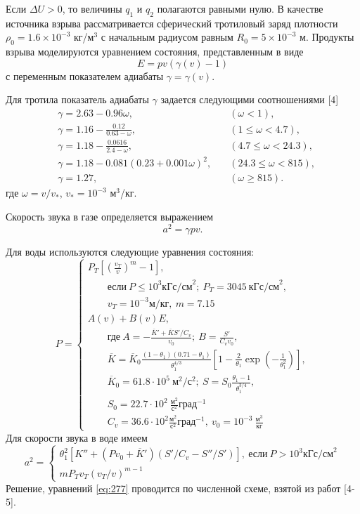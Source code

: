 \documentclass[specialist, subf, href, colorlinks=true, 14pt, final]{disser}
\theoremstyle{definition}
\begin{document}
Если $\Delta U > 0$, то величины $q_1$ и $q_2$ полагаются равными нулю. В качестве источника взрыва рассматривается сферический тротиловый заряд плотности $\rho_0 = 1.6\times 10^{-3}$ кг/м$^3$ с начальным радиусом равным $R_{0} = 5\times 10^{-3}$ м. Продукты взрыва моделируются уравнением состояния, представленным в виде
\[
  E = pv(\gamma(v) - 1)
\]
с переменным показателем адиабаты $\gamma = \gamma(v)$.

Для тротила показатель адиабаты $\gamma$ задается следующими соотношениями [4]
\[
  \begin{aligned}
  &\gamma = 2.63-0.96\omega, & \quad (\omega < 1),\\
  &\gamma = 1.16-\frac{0.12}{0.63 - \omega}, & \quad (1 \leqslant \omega < 4.7),\\
  &\gamma = 1.18-\frac{0.0616}{2.4 - \omega}, & \quad (4.7 \leqslant \omega < 24.3),\\
  &\gamma = 1.18-0.081(0.23 + 0.001\omega)^{2}, & \quad (24.3 \leqslant \omega < 815),\\
  &\gamma = 1.27, & \quad (\omega \geqslant 815).
  \end{aligned}
\]
где $\omega = v/v_*$, $v_{*} = 10^{-3}$ м$^3$/кг.

Скорость звука в газе определяется выражением
\[
  a^{2} = \gamma p v.
\]

Для воды используются следующие уравнения состояния:
\[
  P = 
  \begin{cases}
  \displaystyle P_{T}\left[\left(\frac{v_T}{v}\right)^{m} - 1\right],\\
  \quad\quad \text{если}\ P\leqslant 10^{3} \text{кГс/см}^{2};\ P_{T} = 3045\ \text{кГс/см}^{2},\\
  \quad\quad v_{T} = 10^{-3} \text{м/кг},\ m = 7.15\\
  A(v)+B(v)E,\\
  \quad\quad \text{где}\ A = \displaystyle -\frac{\overline{K}' + \overline{K}S' / C_{v}}{v_0};\ B = \frac{S'}{C_{v}v_0},\\
  \quad\quad \overline{K} = \displaystyle \overline{K}_{0}\frac{(1-\theta_{1})(0.71 - \theta_{1})}{\theta_{1}^{4/3}}\left[1 - \frac{2}{\theta_1}\exp\left(-\frac{1}{\theta_{1}^{2}}\right)\right],\\
  \quad\quad \overline{K}_{0} = 61.8\cdot 10^{5}\ \text{м}^{2}/\text{с}^{2};\ S = \displaystyle S_{0}\frac{\theta_{1}-1}{\theta_{1}^{3/4}},\\
  \quad\quad S_{0} = \displaystyle 22.7\cdot 10^{2}\ \frac{\text{м}^{2}}{\text{с}^{2}}\text{град}^{-1}\\ 
  \quad\quad C_{v} = \displaystyle 36.6 \cdot 10^{2} \frac{\text{м}^{2}}{\text{с}^{2}}\text{град}^{-1},\ v_{0} = 10^{-3}\ \frac{\text{м}^{3}}{\text{кг}}
  \end{cases}
\]
Для скорости звука в воде имеем
\[
  a^{2} = 
  \begin{cases}
  \theta_{1}^{2}\left[K'' + (Pv_{0} + \overline{K}')(S'/C_{v} - S''/S')\right],\ \text{если}\ P > 10^{3} \text{кГс/см}^2\\
  mP_{T}v_{T}(v_{T}/v)^{m-1}
  \end{cases}
\]
Решение, уравнений \eqref{eq:277} проводится по численной схеме, взятой из работ [4-5].
\end{document}
